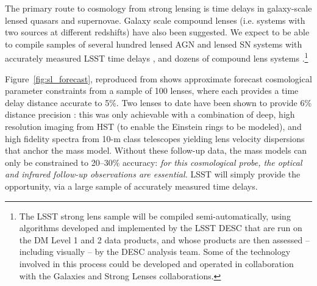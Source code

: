 The primary route to cosmology from strong lensing is time delays in
galaxy-scale lensed quasars and supernovae. Galaxy scale compound lenses
(i.e. systems with two sources at different redshifts) have also been
suggested. We expect to be able to compile samples of several hundred lensed AGN
and lensed SN systems with accurately measured LSST time delays \citep{LiaoEtal2015},
and dozens of compound lens systems \citep{Collett2015}.\footnote{The
LSST strong lens sample will be compiled semi-automatically, using algorithms developed and implemented by the LSST DESC that are
run on the DM Level 1 and 2 data products, and whose products are then assessed -- including visually -- by the DESC analysis team. Some of the technology involved in this process could be developed and operated in collaboration with the Galaxies and Strong Lenses collaborations.}

Figure~\ref{fig:sl_forecast}, reproduced from \citet{Coe+Moustakas2009}
shows approximate forecast cosmological  parameter constraints from a
sample of 100 lenses, where each provides a  time delay distance
accurate to 5\%. Two lenses to date have been  shown to provide 6\%
distance precision \citep{SuyuEtal2014}: this was only  achievable with a
combination of deep, high resolution imaging from HST (to enable the
Einstein rings to be modeled), and high fidelity spectra from 10-m class
telescopes yielding lens velocity dispersions that anchor the mass
model. Without these follow-up data, the mass models can only be
constrained to 20--30\% accuracy: {\it for this cosmological probe, the
optical and infrared follow-up observations are essential.} LSST will
simply provide the opportunity, via a large sample of accurately
measured time delays.

